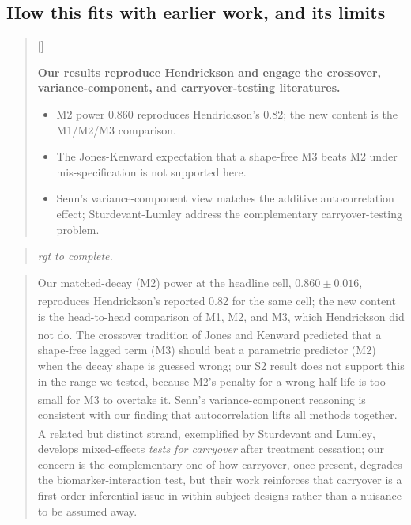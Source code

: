 \documentclass[
  11pt,
]{article}
\newcounter{pgraph}
\newenvironment{bullets}{%
  \stepcounter{pgraph}%
  \begin{quote}\small\sffamily\color[gray]{0.30}%
  {\normalfont\scriptsize\color[gray]{0.58}[\thepgraph]\enspace}}{%
  \end{quote}}
\newenvironment{rgt}{%
  \begin{quote}\small\itshape\color[RGB]{20,60,160}}{%
  \end{quote}}
\newenvironment{orig}{%
  \begin{quote}\normalsize\color[gray]{0.55}}{%
  \end{quote}}
\begin{document}
\subsection{How this fits with earlier work, and its limits}\label{how-this-fits-with-earlier-work-and-its-limits}

\begin{bullets}

\textbf{Our results reproduce Hendrickson and engage the
crossover, variance-component, and carryover-testing literatures.}

\begin{itemize}\setlength{\itemsep}{2pt}\setlength{\parskip}{0pt}
\item M2 power 0.860 reproduces Hendrickson's 0.82; the new content
is the M1/M2/M3 comparison.
\item The Jones-Kenward expectation that a shape-free M3 beats M2
under mis-specification is not supported here.
\item Senn's variance-component view matches the additive
autocorrelation effect; Sturdevant-Lumley address the complementary
carryover-testing problem.
\end{itemize}

\end{bullets}

\begin{rgt}
rgt to complete.

\end{rgt}

\begin{orig}
Our matched-decay (M2) power at the headline cell, \(0.860 \pm
0.016\), reproduces Hendrickson's\textsuperscript{} reported 0.82
for the same cell; the new content is the head-to-head comparison
of M1, M2, and M3, which Hendrickson did not do. The crossover
tradition of Jones and Kenward\textsuperscript{} predicted
that a shape-free lagged term (M3) should beat a parametric
predictor (M2) when the decay shape is guessed wrong; our S2 result
does not support this in the range we tested, because M2's penalty
for a wrong half-life is too small for M3 to overtake it. Senn's\textsuperscript{} variance-component reasoning is consistent
with our finding that autocorrelation lifts all methods together.
A related but distinct strand, exemplified by Sturdevant and Lumley\textsuperscript{}, develops mixed-effects \emph{tests for
carryover} after treatment cessation; our concern is the
complementary one of how carryover, once present, degrades the
biomarker-interaction test, but their work reinforces that
carryover is a first-order inferential issue in within-subject
designs rather than a nuisance to be assumed away.

\end{orig}
\end{document}

